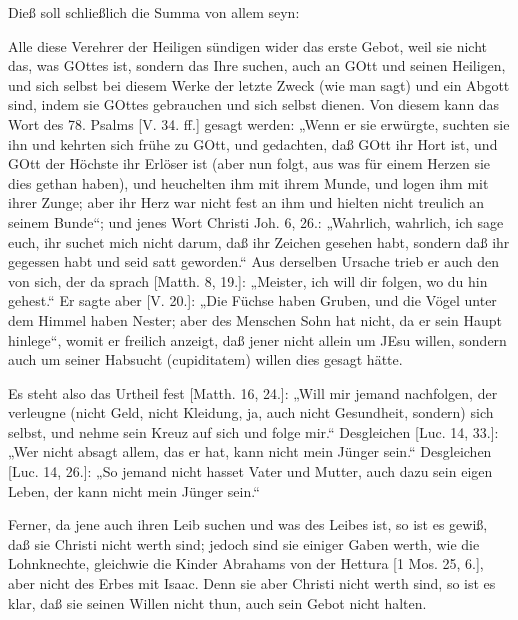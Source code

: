 Dieß soll schließlich die Summa von allem seyn:

Alle diese Verehrer der Heiligen sündigen wider das erste Gebot, weil sie nicht das, was GOttes ist, sondern das Ihre suchen, auch an GOtt und seinen Heiligen, und sich selbst bei diesem Werke der letzte Zweck (wie man sagt) und ein Abgott sind, indem sie GOttes gebrauchen und sich selbst dienen. Von diesem kann das Wort des 78. Psalms [V. 34. ff.] gesagt werden: „Wenn er sie erwürgte, suchten sie ihn und kehrten sich frühe zu GOtt, und gedachten, daß GOtt ihr Hort ist, und GOtt der Höchste ihr Erlöser ist (aber nun folgt, aus was für einem Herzen sie dies gethan haben), und heuchelten ihm mit ihrem Munde, und logen ihm mit ihrer Zunge; aber ihr Herz war nicht fest an ihm und hielten nicht treulich an seinem Bunde“; und jenes Wort Christi Joh. 6, 26.: „Wahrlich, wahrlich, ich sage euch, ihr suchet mich nicht darum, daß ihr Zeichen gesehen habt, sondern daß ihr gegessen habt und seid satt geworden.“ Aus derselben Ursache trieb er auch den von sich, der da sprach [Matth. 8, 19.]: „Meister, ich will dir folgen, wo du hin gehest.“ Er sagte aber [V. 20.]: „Die Füchse haben Gruben, und die Vögel unter dem Himmel haben Nester; aber des Menschen Sohn hat nicht, da er sein Haupt hinlege“, womit er freilich anzeigt, daß jener nicht allein um JEsu willen, sondern auch um seiner Habsucht (cupiditatem) willen dies gesagt hätte.

Es steht also das Urtheil fest [Matth. 16, 24.]: „Will mir jemand nachfolgen, der verleugne (nicht Geld, nicht Kleidung, ja, auch nicht Gesundheit, sondern) sich selbst, und nehme sein Kreuz auf sich und folge mir.“ Desgleichen [Luc. 14, 33.]: „Wer nicht absagt allem, das er hat, kann nicht mein Jünger sein.“ Desgleichen [Luc. 14, 26.]: „So jemand nicht hasset Vater und Mutter, auch dazu sein eigen Leben, der kann nicht mein Jünger sein.“

Ferner, da jene auch ihren Leib suchen und was des Leibes ist, so ist es gewiß, daß sie Christi nicht werth sind; jedoch sind sie einiger Gaben werth, wie die Lohnknechte, gleichwie die Kinder Abrahams von der Hettura [1 Mos. 25, 6.], aber nicht des Erbes mit Isaac. Denn sie aber Christi nicht werth sind, so ist es klar, daß sie seinen Willen nicht thun, auch sein Gebot nicht halten.

